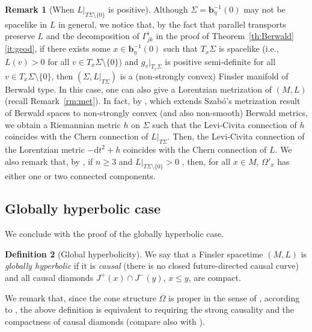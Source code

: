 \documentclass[a4paper,11pt]{article}
\numberwithin{equation}{section}
\theoremstyle{definition}
\newtheorem{definition}{Definition}[section]
\newtheorem{remark}[definition]{Remark}
\theoremstyle{plain}
\newcommand{\dd}{\mathrm{d}}
\newcommand{\bb}{\ensuremath{\mathbf{b}}}
\begin{document}
\begin{remark}[When $L|_{T\Sigma\setminus \{0\}}$ is positive]\label{rm:Sigma}
Although $\Sigma=\bb_\eta^{-1}(0)$ may not be spacelike in $L$ in general, we notice that, by the fact that parallel transports preserve $L$ and the decomposition of $\Gamma^i_{jk}$ in the proof of Theorem~\ref{th:Berwald}\eqref{it:geod}, if there exists some $x \in \bb_\eta^{-1}(0)$ such that $T_x\Sigma$ is spacelike (i.e., $L(v)>0$ for all $v\in T_x \Sigma\setminus\{0\}$) and $g_v|_{T_x\Sigma}$ is positive semi-definite for all $v \in T_x\Sigma \setminus \{0\}$, then $(\Sigma,L|_{T\Sigma})$ is a (non-strongly convex) Finsler manifold of Berwald type.
In this case, one can also give a Lorentzian metrization of $(M,L)$ (recall Remark~\ref{rm:met}).
In fact, by \cite[Remark(A), p.~2157]{MatTro}, which extends Szab\'o's metrization result of Berwald spaces \cite{Sz} to  non-strongly convex (and also non-smooth) Berwald metrics,
we obtain a Riemannian metric $h$ on $\Sigma$ such that the Levi-Civita connection of $h$ coincides with the Chern connection of $L|_{T\Sigma}$.
Then, the Levi-Civita connection of the Lorentzian metric $-\dd t^2 +h$ coincides with the Chern connection of $L$.
We also remark that, by \cite[Proposition~2, Lemma~2]{Min-cone}, if $n\geq 3$ and $L|_{T\Sigma\setminus \{0\}}>0$ , then, for all $x\in M$, $\Omega'_x$ has either one or two connected components.
\end{remark}

\subsection{Globally hyperbolic case}\label{ssc:ghyp}

We conclude with the proof of the globally hyperbolic case.

\begin{definition}[Global hyperbolicity]\label{df:gh}
We say that a Finsler spacetime $(M,L)$ is \emph{globally hyperbolic} if it is \emph{causal} (there is no closed future-directed causal curve) and all causal diamonds $J^+(x) \cap J^-(y)$, $x \le y$, are compact.
\end{definition}

We remark that, since the cone structure $\overline{\Omega}$ is proper in the sense of  \cite[Definition~2.3]{Min-causality}, according to \cite[Corollary~2.4]{Min-causality}, the above definition is equivalent to requiring the strong causality and the compactness of causal diamonds (compare also with \cite[Appendix~B]{CCGP}).
\end{document}

